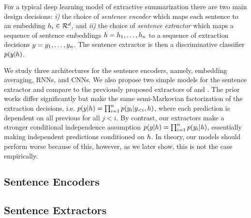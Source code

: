 
For a typical deep learning model of extractive 
summarization there are two main design decisions:
\textit{i)}  the choice of \textit{sentence encoder} 
which maps each sentence \sent[i] 
to an embedding $\sentEmb[i] \in \mathcal{R}^{\sentEmbSize}$, 
and 
\textit{ii)} the choice of \textit{sentence extractor} 
which maps a sequence of sentence embeddings 
$\sentEmb = \sentEmb[1],\ldots, \sentEmb[\docSize]$  
to a sequence of extraction
decisions $\slabel = \slabel_1,\ldots,\slabel_{\docSize}$.
The sentence extractor is then a discriminative 
classifier $p(\slabel | \sentEmb)$.

We study three architectures for the sentence encoders, namely, 
embedding averaging, RNNs, and 
CNNs.
We also propose two simple models for the sentence extractor and compare
to the previously proposed extractors of 
\citet{cheng2016neural} and \citet{nallapati2017summarunner}.
The prior works differ significantly but make the same semi-Markovian
factorization of the extraction decisions, i.e. 
$p(\slabel|\sentEmb)=\prod_{i=1}^\docSize p(\slabel[i]|\slabel[<i],\sentEmb)$,
where each prediction \slabel[i] is dependent on all previous \slabel[j] for
all $j < i$.
By contrast, our extractors make a stronger conditional independence 
assumption $p(\slabel|\sentEmb)=\prod_{i=1}^\docSize p(\slabel[i]|\sentEmb)$,
essentially making independent predictions conditioned on $\sentEmb$.
In theory, our models should perform worse because of this, however, as
we later show, this is not the case empirically.







\subsection{Sentence Encoders}


\subsection{Sentence Extractors}



